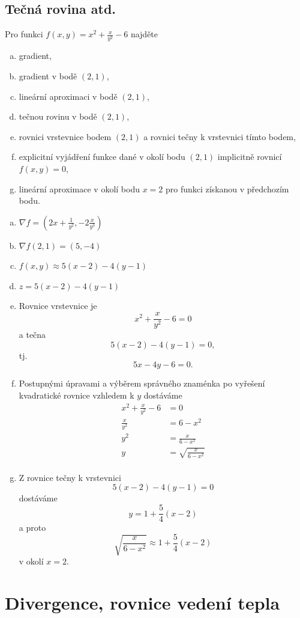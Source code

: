 \konec


\subsection{Tečná rovina atd.}

Pro funkci $f(x,y)=x^2+\frac x{y^2}-6$ najděte
\begin{enumerate}[a)]
\item gradient, 
\item gradient v bodě $(2,1)$,
\item lineární aproximaci v bodě $(2,1)$,
\item tečnou rovinu v bodě $(2,1)$,
\item rovnici vrstevnice bodem $(2,1)$ a rovnici tečny k vrstevnici tímto bodem,
\item explicitní vyjádření funkce dané v okolí bodu $(2,1)$ implicitně rovnicí $f(x,y)=0$,
\item lineární aproximace v okolí bodu $x=2$ pro funkci získanou v předchozím bodu.
\end{enumerate}

\reseni
\begin{enumerate}[a)]
\item $\nabla f=\left(2x+\frac 1{y^2},-2\frac x{y^3}\right)$
\item $\nabla f(2,1)=(5,-4)$
\item $f(x,y)\approx 5(x-2)-4(y-1)$
\item $z= 5(x-2)-4(y-1)$
\item Rovnice vrstevnice je $$x^2+\frac x{y^2}-6=0$$
  a tečna $$5(x-2)-4(y-1)=0,$$ tj. $$5x-4y-6=0.$$
\item Postupnými úpravami a výběrem správného znaménka po vyřešení kvadratické rovnice vzhledem k $y$ dostáváme
  $$
  \begin{aligned}
    x^2+\frac x{y^2}-6&=0\\
        \frac x{y^2}&=6-x^2\\
        y^2&=\frac{x}{6-x^2}\\
        y&=\sqrt{\frac{x}{6-x^2}}\\
  \end{aligned}
$$
\item Z rovnice tečny k vrstevnici $$5(x-2)-4(y-1)=0$$
  dostáváme $$y=1+\frac 54 (x-2)$$
  a proto
  $$\sqrt{\frac{x}{6-x^2}}\approx 1+\frac 54 (x-2)$$ v okolí $x=2$.
\end{enumerate}

\konec


\stranka
\section{Divergence, rovnice vedení tepla}


